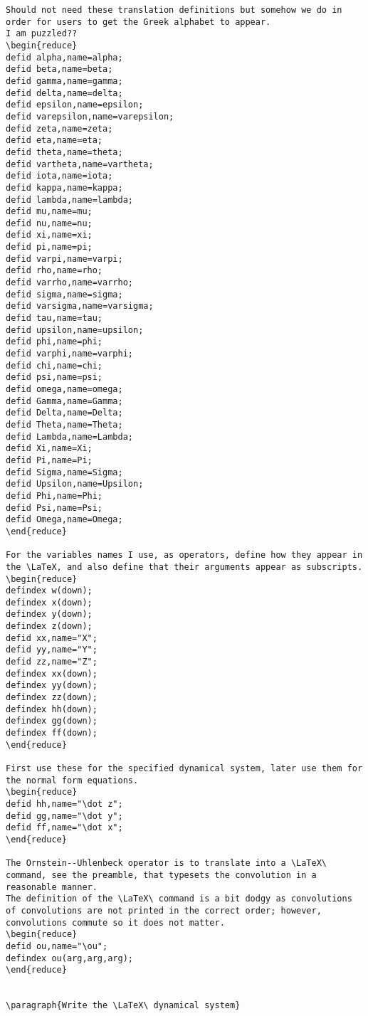 \documentclass[11pt,a5paper]{article}
\def\ou\big(#1,#2,#3\big){{e^{\if#31\else#3\fi t}\star}#1\,}
\begin{document}
\begin{reduce}
\begin{verbatim}
Should not need these translation definitions but somehow we do in order for users to get the Greek alphabet to appear.
I am puzzled??
\begin{reduce}
defid alpha,name=alpha;
defid beta,name=beta;
defid gamma,name=gamma;
defid delta,name=delta;
defid epsilon,name=epsilon;
defid varepsilon,name=varepsilon;
defid zeta,name=zeta;
defid eta,name=eta;
defid theta,name=theta;
defid vartheta,name=vartheta;
defid iota,name=iota;
defid kappa,name=kappa;
defid lambda,name=lambda;
defid mu,name=mu;
defid nu,name=nu;
defid xi,name=xi;
defid pi,name=pi;
defid varpi,name=varpi;
defid rho,name=rho;
defid varrho,name=varrho;
defid sigma,name=sigma;
defid varsigma,name=varsigma;
defid tau,name=tau;
defid upsilon,name=upsilon;
defid phi,name=phi;
defid varphi,name=varphi;
defid chi,name=chi;
defid psi,name=psi;
defid omega,name=omega;
defid Gamma,name=Gamma;
defid Delta,name=Delta;
defid Theta,name=Theta;
defid Lambda,name=Lambda;
defid Xi,name=Xi;
defid Pi,name=Pi;
defid Sigma,name=Sigma;
defid Upsilon,name=Upsilon;
defid Phi,name=Phi;
defid Psi,name=Psi;
defid Omega,name=Omega;
\end{reduce}

For the variables names I use, as operators, define how they appear in the \LaTeX, and also define that their arguments appear as subscripts.
\begin{reduce}
defindex w(down);
defindex x(down);
defindex y(down);
defindex z(down);
defid xx,name="X";
defid yy,name="Y";
defid zz,name="Z";
defindex xx(down);
defindex yy(down);
defindex zz(down);
defindex hh(down);
defindex gg(down);
defindex ff(down);
\end{reduce}

First use these for the specified dynamical system, later use them for the normal form equations.
\begin{reduce}
defid hh,name="\dot z";
defid gg,name="\dot y";
defid ff,name="\dot x";
\end{reduce}

The Ornstein--Uhlenbeck operator is to translate into a \LaTeX\ command, see the preamble, that typesets the convolution in a reasonable manner.
The definition of the \LaTeX\ command is a bit dodgy as convolutions of convolutions are not printed in the correct order; however,  convolutions commute so it does not matter.
\begin{reduce}
defid ou,name="\ou";
defindex ou(arg,arg,arg);
\end{reduce}


\paragraph{Write the \LaTeX\ dynamical system}


\end{verbatim}
\end{reduce}
\end{document}
